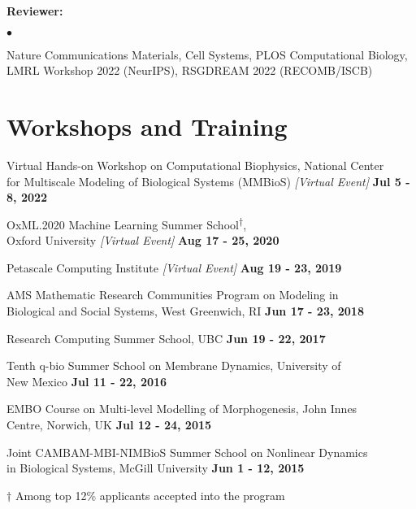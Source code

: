\documentclass[margin,line]{res}
\newenvironment{list1}{
  \begin{list}{\ding{113}}{
      \setlength{\itemsep}{0in}
      \setlength{\parsep}{0in} \setlength{\parskip}{0in}
      \setlength{\topsep}{0in} \setlength{\partopsep}{0in}
      \setlength{\leftmargin}{0.17in}}}{\end{list}}
\newenvironment{list2}{
  \begin{list}{$\bullet$}{
      \setlength{\itemsep}{0in}
      \setlength{\parsep}{0in} \setlength{\parskip}{0in}
      \setlength{\topsep}{0in} \setlength{\partopsep}{0in}
      \setlength{\leftmargin}{0.2in}}}{\end{list}}
\begin{document}
\begin{resume}
\begin{list1}
\item[] {\bf Reviewer:}
\vspace*{.2cm}
\begin{list2}
\item[] Nature Communications Materials, Cell Systems, PLOS Computational Biology, LMRL Workshop 2022 (NeurIPS), RSGDREAM 2022 (RECOMB/ISCB)
\end{list2}

\end{list1}


\section{\sc Workshops and Training}

\begin{list1}
\setlength\itemsep{0.5em}
\item[] Virtual Hands-on Workshop on Computational Biophysics, National Center \\ for Multiscale Modeling of Biological Systems (MMBioS) \textit{[Virtual Event]} \hfill {\bf Jul 5 - 8, 2022}
\item[] OxML.2020 Machine Learning Summer School\textsuperscript{$\dagger$}, \\ Oxford University \textit{[Virtual Event]} \hfill {\bf Aug 17 - 25, 2020}
\item[] Petascale Computing Institute \textit{[Virtual Event]} \hfill {\bf Aug 19 - 23, 2019}
\item[] AMS Mathematic Research Communities Program on Modeling in \\ Biological and Social Systems, West Greenwich, RI \hfill {\bf Jun 17 - 23, 2018}
\item[] Research Computing Summer School, UBC \hfill {\bf Jun 19 - 22, 2017}
\item[] Tenth q-bio Summer School on Membrane Dynamics, University of \\ New Mexico \hfill {\bf Jul 11 - 22, 2016}
\item[] EMBO Course on Multi-level Modelling of Morphogenesis, John Innes \\ Centre, Norwich, UK  \hfill {\bf Jul 12 - 24, 2015}
\item[] Joint CAMBAM-MBI-NIMBioS Summer School on Nonlinear Dynamics \\ in Biological Systems, McGill University \hfill {\bf Jun 1 - 12, 2015}
\item[] $\dagger$ Among top 12\% applicants accepted into the program
\end{list1}



\end{resume}
\end{document}
